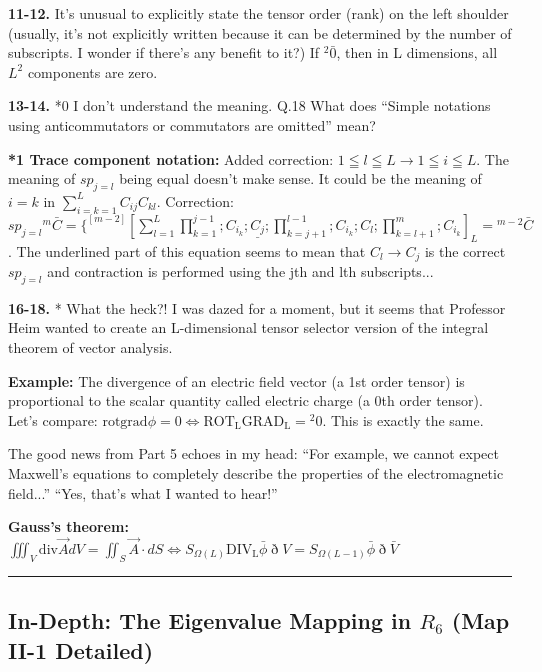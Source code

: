 \documentclass[11pt,a4paper,oneside]{article}
\newcommand{\ethop}{\eth}
\newcommand{\hr}{\par\vspace{2em}\noindent\rule{\linewidth}{0.4pt}\par\vspace{2em}}
\begin{document}
\begin{reflectionbox}[title={Chat / Notes}]
    \textbf{11-12.} It's unusual to explicitly state the tensor order (rank) on the left shoulder (usually, it's not explicitly written because it can be determined by the number of subscripts. I wonder if there's any benefit to it?) If ${}^2\bar{0}$, then in L dimensions, all $L^2$ components are zero.
    
    \textbf{13-14.} *0 I don't understand the meaning. Q.18 What does ``Simple notations using anticommutators or commutators are omitted'' mean?
    
    \textbf{*1 Trace component notation:} 
    Added correction: $1 \leqq l \leqq L \to 1 \leqq i \leqq L$. The meaning of $sp_{j=l}$ being equal doesn't make sense. It could be the meaning of $i=k$ in $\sum_{i=k=1}^L C_{ij}C_{kl}$.
    Correction: $sp_{j = l} {}^m \bar {C} = \{^{[m-2]} [\sum_{l = 1}^L \prod_{k = 1}^{j-1}; C_{i_k}; \underline{C_j}; \prod_{k = j + 1}^{l-1}; C_{i_k};C_l; \prod_{k = l + 1}^{m }; C_{i_k}]_L = {}^{m-2} \bar {C}$.
    The underlined part of this equation seems to mean that $C_l \to C_j$ is the correct $sp_{j=l}$ and contraction is performed using the jth and lth subscripts...
    
    \textbf{16-18.} * What the heck?! I was dazed for a moment, but it seems that Professor Heim wanted to create an L-dimensional tensor selector version of the integral theorem of vector analysis.
    
    \textbf{Example:} The divergence of an electric field vector (a 1st order tensor) is proportional to the scalar quantity called electric charge (a 0th order tensor). Let's compare:
    $\mathrm{rot}\mathrm{grad} \phi =0 \iff \mathrm{ROT_L}\mathrm{GRAD_L} = {}^2 0$. This is exactly the same.
    
    The good news from Part 5 echoes in my head: ``For example, we cannot expect Maxwell's equations to completely describe the properties of the electromagnetic field...'' ``Yes, that's what I wanted to hear!''
    
    \textbf{Gauss's theorem:}
    $\iiint_V \mathrm{div} \vec{A}dV = \iint_S \vec{A} \cdot dS \iff S_{\Omega(L)} \mathrm{DIV_L} \bar {\phi}\ethop V = S_{\Omega(L-1)} \bar {\phi}\ethop\bar {V}$
\end{reflectionbox}

\hr

\subsection*{In-Depth: The Eigenvalue Mapping in $R_6$ (Map II-1 Detailed)}
\end{document}
